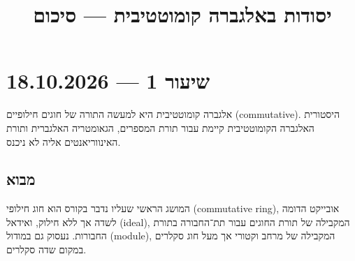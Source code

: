 
\title{יסודות באלגברה קומוטטיבית --- סיכום}
\setcounter{secnumdepth}{2}

\usepackage{fancyhdr}
\pagestyle{fancy}
\renewcommand{\headrulewidth}{0pt}

\DeclareMathOperator\Mon{Mon}
\DeclareMathOperator\Nil{Nil}
\DeclareMathOperator\loc{loc}
\DeclareMathOperator\Frac{Frac}
\DeclareMathOperator\Mor{Mor}
\DeclareMathOperator\Ann{Ann}


\maketitle
\maketitleprint[red]{}

\tableofcontents

\section{שיעור 1 --- 18.10.2026}
אלגברה קומוטטיבית היא למעשה התורה של חוגים חילופיים (commutative).
היסטורית האלגברה הקומוטטיבית קיימת עבור תורת המספרים, הגאומטריה האלגברית ותורת האינווריאנטים אליה לא ניכנס.

\subsection{מבוא}
המושג הראשי שעליו נדבר בקורס הוא חוג חילופי (commutative ring), אובייקט הדומה לשדה אך ללא חילוק, ואידאל (ideal), המקבילה של תורת החוגים עבור תת־החבורה בתורת החבורות.
נעסוק גם במודול (module), המקבילה של מרחב וקטורי אך מעל חוג סקלרים במקום שדה סקלרים.

